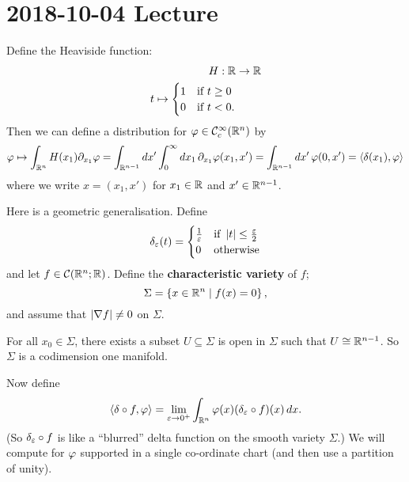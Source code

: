 \section{2018-10-04 Lecture}

\begin{exam}
  \lv
  \begin{enum}
    \io
    Define the Heaviside function:
    \begin{align*}
      H: \mathbb{R} &\to \mathbb{R} \\
      t \mapsto
      \begin{cases}
	1 & \text{if }t\geq0 \\
	0 & \text{if }t<0.
      \end{cases}
    \end{align*}
    Then we can define a distribution for $\varphi\in\mathcal{C}_c^\infty(\mathbb{R}^n)$ by
    \[ \varphi \mapsto \int_{\mathbb{R}^n} H(x_1) \partial_{x_1} \varphi = \int_{\mathbb{R}^{n-1}} dx' \int_0^\infty dx_1 \, \partial_{x_1} \varphi(x_1,x') = \int_{\mathbb{R}^{n-1}} dx' \, \varphi(0,x') = {\left\langle \delta(x_1),\varphi \right\rangle} \]
    where we write $x=(x_1,x')$ for $x_1\in\mathbb{R}$ and $x'\in\mathbb{R}^{n-1}$.

    \io
    Here is a geometric generalisation.
    Define
    \begin{equation*}
      \delta_\varepsilon(t)=
      \begin{cases}
	\frac1{\varepsilon} &\text{if }\left\lvert t \right\rvert\leq\frac{\varepsilon}2 \\
	0 &\text{otherwise}
      \end{cases}
    \end{equation*}
    and let $f\in\mathcal{C}(\mathbb{R}^n;\mathbb{R})$.
    Define the \textbf{characteristic variety} of $f$;
    \[ \Sigma=\left\{ x\in\mathbb{R}^n \mid f(x)=0 \right\}, \]
    and assume that $\left\lvert \nabla f \right\rvert\neq0$ on $\Sigma$.

    \begin{exer}
      For all $x_0\in\Sigma$, there exists a subset $U\subseteq\Sigma$ is open in $\Sigma$ such that $U\cong\mathbb{R}^{n-1}$.
      So $\Sigma$ is a codimension one manifold.
    \end{exer}

    Now define
    \[ {\left\langle \delta\circ f,\varphi \right\rangle} = \lim_{\varepsilon\to0^+} \int_{\mathbb{R}^n} \varphi(x) (\delta_\varepsilon\circ f)(x) \, dx. \]
    (So $\delta_\varepsilon\circ f$ is like a ``blurred'' delta function on the smooth variety $\Sigma$.)
    We will compute for $\varphi$ supported in a single co-ordinate chart (and then use a partition of unity).


\end{enum}
\end{exam}
